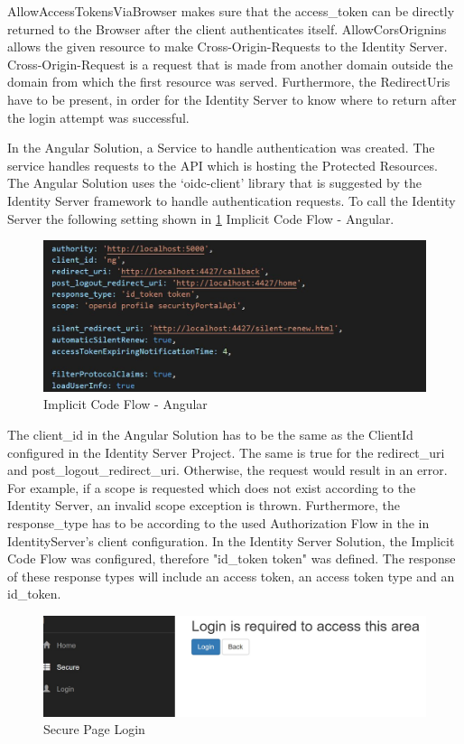 AllowAccessTokensViaBrowser makes sure that the access\_token can be directly returned to the Browser after the client authenticates itself. AllowCorsOrignins allows the given resource to make Cross-Origin-Requests to the Identity Server. Cross-Origin-Request is a request that is made from another domain outside the domain from which the first resource was served. Furthermore, the RedirectUris have to be present, in order for the Identity Server to know where to return after the login attempt was successful. 


In the Angular Solution, a Service to handle authentication was created. The service handles requests to the API which is hosting the Protected Resources. The Angular Solution uses the ‘oidc-client’ library that is suggested by the Identity Server framework to handle authentication requests. To call the Identity Server the following setting shown in \ref{fig:implicitcodeflowangular} Implicit Code Flow - Angular.

\begin{figure}[h]
	\centering
	\includegraphics[width=0.8\linewidth]{images/implicit_code_flow_angular}
	\caption{Implicit Code Flow - Angular}
	\label{fig:implicitcodeflowangular}
\end{figure}


The client\_id in the Angular Solution has to be the same as the ClientId configured in the Identity Server Project. The same is true for the redirect\_uri and post\_logout\_redirect\_uri. Otherwise, the request would result in an error. For example, if a scope is requested which does not exist according to the Identity Server, an invalid scope exception is thrown. Furthermore, the response\_type has to be according to the used Authorization Flow in the in IdentityServer's client configuration. In the Identity Server Solution, the  Implicit Code Flow was configured, therefore "id\_token token" was defined. The response of these response types will include an access token, an access token type and an id\_token.  

\begin{figure}[h]
	\centering
	\includegraphics[width=0.8\linewidth]{images/secure_page_requires_login}
	\caption{Secure Page Login}
	\label{fig:securepagerequireslogin}
\end{figure}

